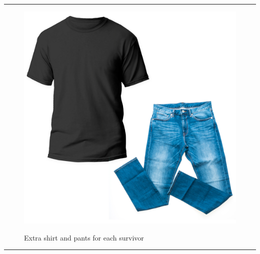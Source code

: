 \documentclass{article}
\begin{document}
    
        \par\noindent\rule{\textwidth}{0.4pt}
    \begin{figure}[H]
        \centering
        \begin{minipage}{0.25\textwidth}
            \centering
            \includegraphics[width=\textwidth]{../SurvivalItemImages/shirt_trousers}
        \end{minipage}\hfill
        \begin{minipage}{0.7\textwidth}
            \centering
            \Large Extra shirt and pants for each survivor
        \end{minipage}
    \end{figure}
    \vspace{-0.8em}
    \noindent\rule{\textwidth}{0.4pt}
            
\end{document}
